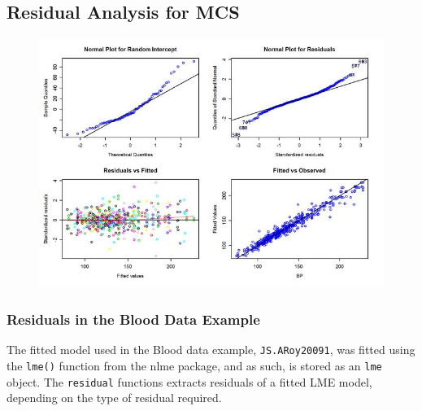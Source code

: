 \documentclass[12pt, a4paper]{report}
\theoremstyle{plain}
\theoremstyle{definition}
\theoremstyle{remark}
\begin{document}
	
	
	
	

	\subsection{Residual Analysis for MCS}
	
	\begin{figure}[h!]
		\centering
		\includegraphics[width=0.9\linewidth]{images/ResidPlot}
		\caption{}
		\label{fig:ResidPlot}
	\end{figure}


	
	
	\subsubsection{Residuals in the Blood Data Example}
	The fitted model used in the Blood data example, \texttt{JS.ARoy20091}, was fitted using the \texttt{lme()} function from the nlme package, and as such, is stored as an \texttt{lme} object. The \texttt{residual} functions extracts residuals of a fitted LME model, depending on the type of residual required.
	
\end{document}
